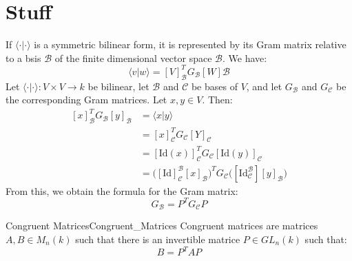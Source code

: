 \section{Stuff}
    If $\langle\cdot|\cdot\rangle$ is a symmetric bilinear form, it is
    represented by its Gram matrix relative to a bsis $\mathscr{B}$ of the
    finite dimensional vector space $\mathscr{B}$. We have:
    \begin{equation}
        \langle{v}|w\rangle
        =[V]_{\mathscr{B}}^{T}G_{\mathscr{B}}[W]\mathscr{B}
    \end{equation}
    Let $\langle\cdot|\cdot\rangle:V\times{V}\rightarrow{k}$ be bilinear,
    let $\mathscr{B}$ and $\mathscr{C}$ be bases of $V$, and let
    $G_{\mathscr{B}}$ and $G_{\mathscr{C}}$ be the corresponding Gram
    matrices. Let $x,y\in{V}$. Then:
    \begin{subequations}
        \begin{align}
            [x]_{\mathscr{B}}^{T}G_{\mathscr{B}}[y]_{\mathscr{B}}
            &=\langle{x}|y\rangle\\
            &=[x]_{\mathscr{C}}^{T}G_{\mathscr{C}}[Y]_{\mathscr{C}}\\
            &=[\textrm{Id}(x)]_{\mathscr{C}}^{T}G_{\mathscr{C}}
                [\textrm{Id}(y)]_{\mathscr{C}}\\
            &=\Big([\textrm{Id}]_{\mathscr{C}}^{\mathscr{B}}
                [x]_{\mathscr{B}}\Big)^{T}G_{\mathscr{C}}
                \Big([\textrm{Id}_{\mathscr{C}}^{\mathscr{B}}]
                    [y]_{\mathscr{B}}\Big)
        \end{align}
    \end{subequations}
    From this, we obtain the formula for the Gram matrix:
    \begin{equation}
        G_{\mathscr{B}}=P^{T}G_{\mathscr{C}}P
    \end{equation}
    \begin{fdefinition}{Congruent Matrices}{Congruent_Matrices}
        Congruent matrices are matrices $A,B\in{M}_{n}(k)$ such that there
        is an invertible matrice $P\in{GL}_{n}(k)$ such that:
        \begin{equation}
            B=P^{T}AP
        \end{equation}
    \end{fdefinition}
